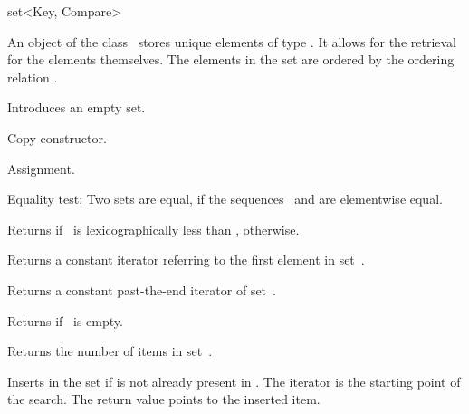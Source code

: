 
\ccHtmlNoClassLinks
\begin{ccClassTemplate} {set<Key, Compare>}


\ccDefinition
An object of the class \ccClassTemplateName\ stores unique elements of
type . It  allows for the retrieval for the elements
themselves. The elements in the set are ordered by the ordering
relation .

\ccHtmlLinksOff
{}
\ccHtmlLinksOn

\ccTypes
{}

\ccCreation
{}


             {Introduces an empty set.}

 	    {Copy constructor.}

\ccOperations

        {Assignment.}

{Equality test: Two sets are equal, if the sequences \ccVar\ and 
 are elementwise equal.}


{Returns  if \ccVar\ is lexicographically less than ,
  otherwise.}

       {Returns a constant iterator referring to the first element in
        set~\ccVar.}

       {Returns a constant past-the-end iterator of set~\ccVar.}

	{Returns  if \ccVar\ is empty.}

	{Returns the number of items in set~\ccVar.}


{Inserts  in the set if  is not already
 present in \ccVar. The iterator  is the starting point of
 the search.  The return value points to the inserted item.}


\end{ccClassTemplate}
